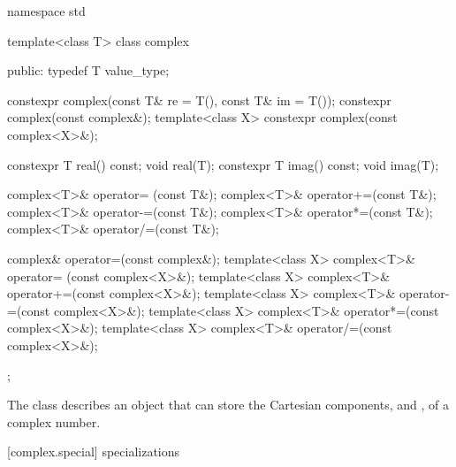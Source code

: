 %
\begin{codeblock}
namespace std {
  template<class T>
  class complex {
  public:
    typedef T value_type;

    constexpr complex(const T& re = T(), const T& im = T());
    constexpr complex(const complex&);
    template<class X> constexpr complex(const complex<X>&);

    constexpr T real() const;
    void real(T);
    constexpr T imag() const;
    void imag(T);

    complex<T>& operator= (const T&);
    complex<T>& operator+=(const T&);
    complex<T>& operator-=(const T&);
    complex<T>& operator*=(const T&);
    complex<T>& operator/=(const T&);

    complex& operator=(const complex&);
    template<class X> complex<T>& operator= (const complex<X>&);
    template<class X> complex<T>& operator+=(const complex<X>&);
    template<class X> complex<T>& operator-=(const complex<X>&);
    template<class X> complex<T>& operator*=(const complex<X>&);
    template<class X> complex<T>& operator/=(const complex<X>&);
  };
}
\end{codeblock}

\pnum
The class
describes an object that can
store the Cartesian components,
and
,
of a complex
number.

[complex.special]{ specializations}

